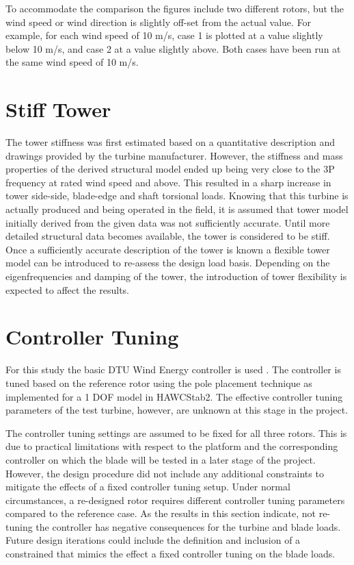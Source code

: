 To accommodate the comparison the figures include two different rotors, but the wind speed or wind direction is slightly off-set from the actual value. For example, for each wind speed of 10 m/s, case 1 is plotted at a  value slightly below 10 m/s, and case 2 at a value slightly above. Both cases have been run at the same wind speed of 10 m/s.


\section{Stiff Tower}
\label{sec:dlb:Stiff Tower}

The tower stiffness was first estimated based on a quantitative description and drawings provided by the turbine manufacturer. However, the stiffness and mass properties of the derived structural model ended up being very close to the 3P frequency at rated wind speed and above. This resulted in a sharp increase in tower side-side, blade-edge and shaft torsional loads. Knowing that this turbine is actually produced and being operated in the field, it is assumed that tower model initially derived from the given data was not sufficiently accurate. Until more detailed structural data becomes available, the tower is considered to be stiff. Once a sufficiently accurate description of the tower is known a flexible tower model can be introduced to re-assess the design load basis. Depending on the eigenfrequencies and damping of the tower, the introduction of tower flexibility is expected to affect the results.


\section{Controller Tuning}
\label{sec:dlb:Controller Tuning}

For this study the basic DTU Wind Energy controller is used \cite{hansen_basic_2013}. The controller is tuned based on the reference rotor using the pole placement technique as implemented for a 1 DOF model in HAWCStab2. The effective controller tuning parameters of the test turbine, however, are unknown at this stage in the project.

The controller tuning settings are assumed to be fixed for all three rotors. This is due to practical limitations with respect to the platform and the corresponding controller on which the blade will be tested in a later stage of the project. However, the design procedure did not include any additional constraints to mitigate the effects of a fixed controller tuning setup. Under normal circumstances, a re-designed rotor requires different controller tuning parameters compared to the reference case. As the results in this section indicate, not re-tuning the controller has negative consequences for the turbine and blade loads. Future design iterations could include the definition and inclusion of a constrained that mimics the effect a fixed controller tuning on the blade loads.


